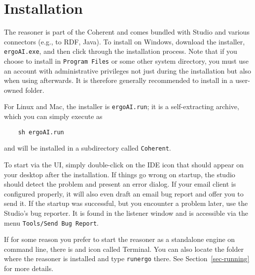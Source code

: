 \section{Installation}\label{sec-install}

The \FLSYSTEM reasoner is part of the Coherent \ERGOAI
and comes bundled with \ERGOAI Studio and various \ERGO connectors (e.g., to
RDF, Java).
To install \ERGOAI on Windows, download the \ERGO installer,
\texttt{ergoAI.exe}, and
then click through the installation process.
Note that if you choose to install \ERGO in \texttt{Program Files} or some
other system directory, you must use an account with administrative
privileges not just during the installation but also when using \ERGO
afterwards. It is therefore generally recommended to install \ERGO in a
user-owned folder.

For Linux and Mac, the installer is \texttt{ergoAI.run}; it is a
self-extracting archive, which you can simply execute as
\begin{verbatim}
    sh ergoAI.run
\end{verbatim}
and \ERGOAI will be installed in a subdirectory called
\texttt{Coherent}. 

To start \FLSYSTEM via the UI, simply double-click on the \ERGOAI IDE icon
that should appear on your desktop after the installation.
If things go wrong on startup, the studio should
detect the problem and present an error dialog. If your email client is
configured properly, it will also
even draft an email bug report and offer you to send it.
If the startup was successful, but you encounter a problem later,
use the Studio's bug reporter. It is found in the listener window and is
accessible via the menu \texttt{Tools/Send Bug Report}. 

If for some reason you prefer to start the \FLSYSTEM reasoner as a
standalone engine on command line, there is and icon called \ERGOAI Terminal.
You can also locate the folder where the reasoner is
installed and type \texttt{runergo} there. See Section~\ref{sec-running}
for more details.



